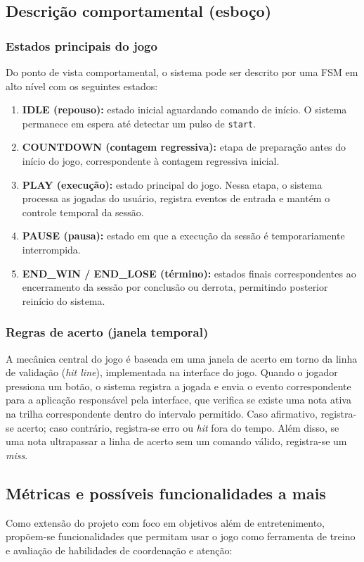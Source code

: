 \documentclass[a4paper,12pt,twoside]{article}
\begin{document}
\subsection{Descrição comportamental (esboço)}

\subsubsection{Estados principais do jogo}
Do ponto de vista comportamental, o sistema pode ser descrito por uma FSM em alto nível com os seguintes estados:

\begin{enumerate}
    \item \textbf{IDLE (repouso):} estado inicial aguardando comando de início. O sistema permanece em espera até detectar um pulso de \texttt{start}.
    \item \textbf{COUNTDOWN (contagem regressiva):} etapa de preparação antes do início do jogo, correspondente à contagem regressiva inicial.
    \item \textbf{PLAY (execução):} estado principal do jogo. Nessa etapa, o sistema processa as jogadas do usuário, registra eventos de entrada e mantém o controle temporal da sessão.
    \item \textbf{PAUSE (pausa):} estado em que a execução da sessão é temporariamente interrompida.
    \item \textbf{END\_WIN / END\_LOSE (término):} estados finais correspondentes ao encerramento da sessão por conclusão ou derrota, permitindo posterior reinício do sistema.
\end{enumerate}

\subsubsection{Regras de acerto (janela temporal)}
A mecânica central do jogo é baseada em uma janela de acerto em torno da linha de validação (\emph{hit line}), implementada na interface do jogo. Quando o jogador pressiona um botão, o sistema registra a jogada e envia o evento correspondente para a aplicação responsável pela interface, que verifica se existe uma nota ativa na trilha correspondente dentro do intervalo permitido. Caso afirmativo, registra-se acerto; caso contrário, registra-se erro ou \emph{hit} fora do tempo. Além disso, se uma nota ultrapassar a linha de acerto sem um comando válido, registra-se um \emph{miss}.

\subsection{Métricas e possíveis funcionalidades a mais}
Como extensão do projeto com foco em objetivos além de entretenimento, propõem-se funcionalidades que permitam usar o jogo como ferramenta de treino e avaliação de habilidades de coordenação e atenção:
\end{document}
